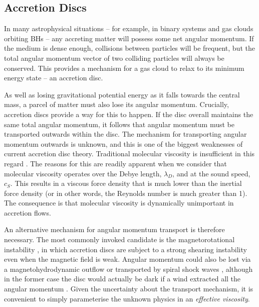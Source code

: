 \subsection{Accretion Discs}

In many astrophysical situations -- for example, 
in binary systems and gas clouds orbiting BHs --
any accreting matter will possess some net angular momentum.
If the medium is dense enough, collisions between particles will be
frequent, but the total angular momentum vector of two colliding particles
will always be conserved. This provides a mechanism for a gas cloud to relax to 
its minimum energy state -- an accretion disc. 

As well as losing gravitational potential energy as it falls towards 
the central mass, a parcel of matter must also lose its angular momentum. 
Crucially, accretion discs provide a way for this to happen. 
If the disc overall maintains the same total 
angular momentum, it follows that angular momentum must 
be transported outwards within the disc. The mechanism for transporting 
angular momentum outwards is unknown, and this is one of the biggest 
weaknesses of current accretion disc theory. 
Traditional molecular viscosity is insufficient in this regard 
\citep{pringle1981}. The reasons for this are readily apparent
when we consider that molecular viscosity operates over the Debye length,
$\lambda_D$, and at the sound speed, $c_S$. This results in a 
viscous force density that is much lower 
than the inertial force density (or in other words,
the Reynolds number is much greater than 1). The consequence is that
molecular viscosity is dynamically unimportant in accretion flows.

An alternative mechanism for angular momentum transport is therefore
necessary. The most commonly invoked
candidate is the magnetorotational instability \citep[MRI; ][]{balbus1991},
in which accretion discs are subject to a strong shearing instability even
when the magnetic field is weak. 
Angular momentum could also be lost via a magnetohydrodynamic 
outflow \citep{blandfordpayne} or transported by spiral shock waves
\citep{ju2016}, although in the former case the disc would actually
be dark if a wind extracted all the angular momentum 
\citep[e.g.][]{spruit1996,knigge1999}. 
Given the uncertainty about the transport mechanism, it is 
convenient to simply parameterise the unknown physics in 
an {\em effective viscosity}.






